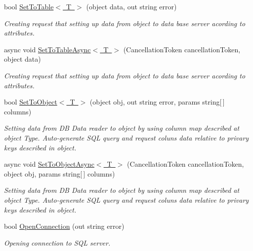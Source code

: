 \begin{DoxyCompactItemize}
bool \mbox{\hyperlink{class_uniform_data_operator_1_1_sql_1_1_my_sql_1_1_my_sql_data_operator_ac1bee965fd57e9b2949c09a6b72a9e3e}{Set\+To\+Table$<$ T $>$}} (object data, out string error)
\begin{DoxyCompactList}\small\item\em Creating request that setting up data from object to data base server acording to attributes. \end{DoxyCompactList}\item 
async void \mbox{\hyperlink{class_uniform_data_operator_1_1_sql_1_1_my_sql_1_1_my_sql_data_operator_a31e1837ecb4c58bbd39a31fa9cf51962}{Set\+To\+Table\+Async$<$ T $>$}} (Cancellation\+Token cancellation\+Token, object data)
\begin{DoxyCompactList}\small\item\em Creating request that setting up data from object to data base server acording to attributes. \end{DoxyCompactList}\item 
bool \mbox{\hyperlink{class_uniform_data_operator_1_1_sql_1_1_my_sql_1_1_my_sql_data_operator_add7cba0bf95fbe58e589b770eee695ee}{Set\+To\+Object$<$ T $>$}} (object obj, out string error, params string\mbox{[}$\,$\mbox{]} columns)
\begin{DoxyCompactList}\small\item\em Setting data from DB Data reader to object by using column map described at object Type. Auto-\/generate S\+QL query and request coluns data relative to privary keys described in object. \end{DoxyCompactList}\item 
async void \mbox{\hyperlink{class_uniform_data_operator_1_1_sql_1_1_my_sql_1_1_my_sql_data_operator_ae3b550f82c725fa4f17d71f5f489dc10}{Set\+To\+Object\+Async$<$ T $>$}} (Cancellation\+Token cancellation\+Token, object obj, params string\mbox{[}$\,$\mbox{]} columns)
\begin{DoxyCompactList}\small\item\em Setting data from DB Data reader to object by using column map described at object Type. Auto-\/generate S\+QL query and request coluns data relative to privary keys described in object. \end{DoxyCompactList}\item 
bool \mbox{\hyperlink{class_uniform_data_operator_1_1_sql_1_1_my_sql_1_1_my_sql_data_operator_ae7ad4f4d29d927fa8551b087a6e596b5}{Open\+Connection}} (out string error)
\begin{DoxyCompactList}\small\item\em Opening connection to S\+QL server. \end{DoxyCompactList}\item 

\end{DoxyCompactItemize}
